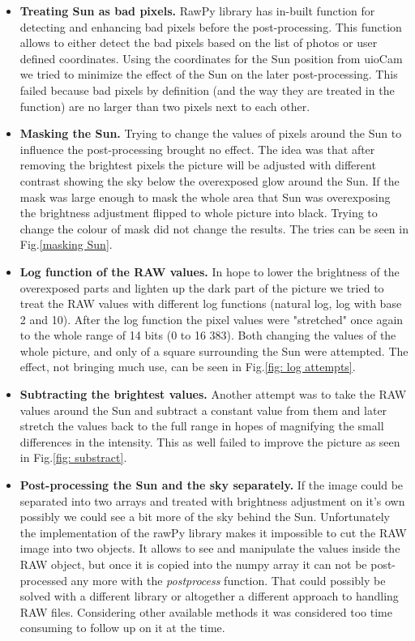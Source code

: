 \documentclass[]{book}
\begin{document}
		\begin{itemize}
			\item \textbf{Treating Sun as bad pixels.} RawPy library has in-built function for detecting and enhancing bad pixels before the post-processing. This function allows to either detect the bad pixels based on the list of photos or user defined coordinates. Using the coordinates for the Sun position from uioCam we tried to minimize the effect of the Sun on the later post-processing. This failed because bad pixels by definition (and the way they are treated in the function) are no larger than two pixels next to each other.
			\item \textbf{Masking the Sun.} Trying to change the values of pixels around the Sun to influence the post-processing brought no effect. The idea was that after removing the brightest pixels the picture will be adjusted with different contrast showing the sky below the overexposed glow around the Sun. If the mask was large enough to mask the whole area that Sun was overexposing the brightness adjustment flipped to whole picture into black. Trying to change the colour of mask did not change the results. The tries can be seen in Fig.\ref{masking Sun}.
			\item \textbf{Log function of the RAW values.} In hope to lower the brightness of the overexposed parts and lighten up the dark part of the picture we tried to treat the RAW values with different log functions (natural log, log with base 2 and 10). After the log function the pixel values were "stretched" once again to the whole range of 14 bits (0 to 16 383). Both changing the values of the whole picture, and only of a square surrounding the Sun were attempted. The effect, not bringing much use, can be seen in Fig.\ref{fig: log attempts}.
			\item \textbf{Subtracting the brightest values.} Another attempt was to take the RAW values around the Sun and subtract a constant value from them and later stretch the values back to the full range in hopes of magnifying the small differences in the intensity. This as well failed to improve the picture as seen in Fig.\ref{fig: substract}.
			\item \textbf{Post-processing the Sun and the sky separately.} If the image could be separated into two arrays and treated with brightness adjustment on it's own possibly we could see a bit more of the sky behind the Sun. Unfortunately the implementation of the rawPy library makes it impossible to cut the RAW image into two objects. It allows to see and manipulate the values inside the RAW object, but once it is copied into the numpy array it can not be post-processed any more with the \textit{postprocess} function. That could possibly be solved with a different library or altogether a different approach to handling RAW files. Considering other available methods it was considered too time consuming to follow up on it at the time.
		\end{itemize}
		
\end{document}
